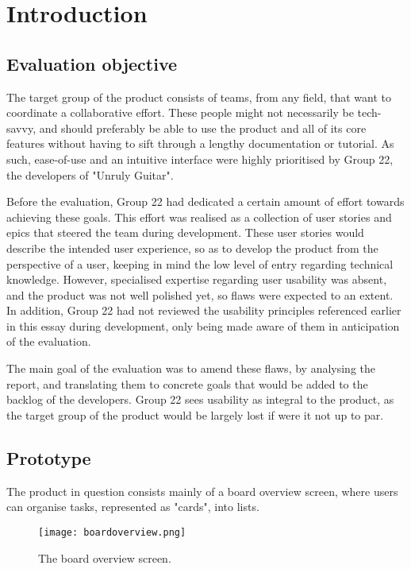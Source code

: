 \section{Introduction}

\subsection{Evaluation objective}
The target group of the product consists of teams, from any field, that want to coordinate a collaborative effort. These people might not necessarily be tech-savvy, and should preferably be able to use the product and all of its core features without having to sift through a lengthy documentation or tutorial. As such, ease-of-use and an intuitive interface were highly prioritised by Group 22, the developers of "Unruly Guitar".

Before the evaluation, Group 22 had dedicated a certain amount of effort towards achieving these goals. This effort was realised as a collection of user stories and epics that steered the team during development. These user stories would describe the intended user experience, so as to develop the product from the perspective of a user, keeping in mind the low level of entry regarding technical knowledge. However, specialised expertise regarding user usability was absent, and the product was not well polished yet, so flaws were expected to an extent. In addition, Group 22 had not reviewed the usability principles referenced earlier in this essay during development, only being made aware of them in anticipation of the evaluation.

The main goal of the evaluation was to amend these flaws, by analysing the report, and translating them to concrete goals that would be added to the backlog of the developers. Group 22 sees usability as integral to the product, as the target group of the product would be largely lost if were it not up to par.
\subsection{Prototype}

The product in question consists mainly of a board overview screen, where users can organise tasks, represented as "cards", into lists.

\begin{figure}[h]
\texttt{[image: boardoverview.png]}
\caption{The board overview screen.}
\end{figure}

